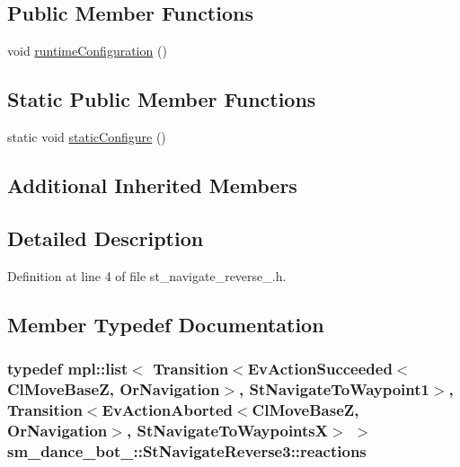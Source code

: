 \subsection*{Public Member Functions}
\begin{DoxyCompactItemize}
\item 
void \hyperlink{structsm__dance__bot__3_1_1StNavigateReverse3_a4015dbaf6f14895f765263d66bdfe710}{runtime\+Configuration} ()
\end{DoxyCompactItemize}
\subsection*{Static Public Member Functions}
\begin{DoxyCompactItemize}
\item 
static void \hyperlink{structsm__dance__bot__3_1_1StNavigateReverse3_a1fd242bcb6a71fba9b974405cd35199e}{static\+Configure} ()
\end{DoxyCompactItemize}
\subsection*{Additional Inherited Members}


\subsection{Detailed Description}


Definition at line 4 of file st\+\_\+navigate\+\_\+reverse\+\_.\+h.



\subsection{Member Typedef Documentation}
\subsubsection[{\texorpdfstring{reactions}{reactions}}]{\setlength{\rightskip}{0pt plus 5cm}typedef mpl\+::list$<$ Transition$<$Ev\+Action\+Succeeded$<${\bf Cl\+Move\+BaseZ}, {\bf Or\+Navigation}$>$, {\bf St\+Navigate\+To\+Waypoint1}$>$, Transition$<$Ev\+Action\+Aborted$<${\bf Cl\+Move\+BaseZ}, {\bf Or\+Navigation}$>$, {\bf St\+Navigate\+To\+WaypointsX}$>$ $>$ {\bf sm\+\_\+dance\+\_\+bot\+\_\+::\+St\+Navigate\+Reverse3\+::reactions}}\hypertarget{structsm__dance__bot__3_1_1StNavigateReverse3_a7c5eacc178ac24b22c600d6b04fbc0fb}{}\label{structsm__dance__bot__3_1_1StNavigateReverse3_a7c5eacc178ac24b22c600d6b04fbc0fb}


